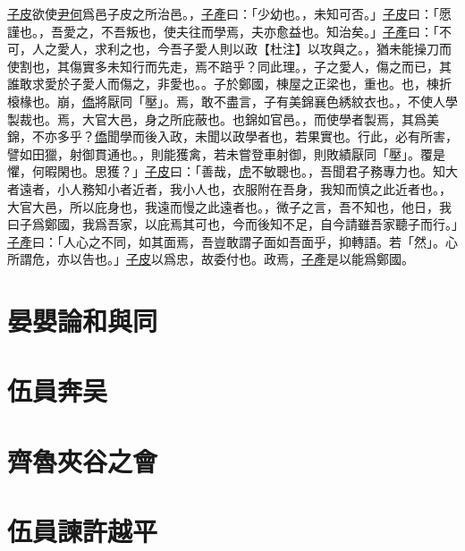 \documentclass{article}
\newcommand{\tsu}{\small\kaishu\color{brown}}
\newcommand{\ta}{\small\kaishu\color{applegreen}}
\begin{document}
\uline{子皮}欲使\uline{尹何}爲邑{\tsu 子皮之所治邑。}，\uline{子產}曰：「少{\tsu 幼也。}，未知可否。」\uline{子皮}曰：「愿{\tsu 謹也。}，吾愛之，不吾叛也，使夫往而學焉，夫亦愈{\tsu 益也。}知治矣。」\uline{子產}曰：「不可，人之愛人，求利之也，今吾子愛人則以政{\ta 【杜注】以攻與之。}，猶未能操刀而使割也，其傷實多{\tsu 未知行而先走，焉不踣乎？同此理。}，子之愛人，傷之而已，其誰敢求愛於子{\tsu 愛人而傷之，非愛也。}。子於鄭國，棟{\tsu 屋之正梁也，重也。}也，棟折榱{\tsu 椽也。}崩，\uline{僑}將厭{\tsu 同「壓」。}焉，敢不盡言，子有美錦{\tsu 襄色綉紋衣也。}，不使人學製{\tsu 裁也。}焉，大官大邑，身之所庇{\tsu 蔽也。}也{\tsu 錦如官邑。}，而使學者製焉，其爲美錦，不亦多乎？\uline{僑}聞學而後入政，未聞以政學者也，若果{\tsu 實也。}行此，必有所害，譬如田獵，射御貫{\tsu 通也。}，則能獲禽，若未嘗登車射御，則敗績厭{\tsu 同「壓」。}覆是懼，何暇{\tsu 閑也。}思獲？」\uline{子皮}曰：「善哉，\uline{虎}不敏{\tsu 聰也。}，吾聞君子務{\tsu 專力也。}知大者遠者，小人務知小者近者，我小人也，衣服附在吾身，我知而慎之{\tsu 此近者也。}，大官大邑，所以庇身也，我遠而慢之{\tsu 此遠者也。}，微子之言，吾不知也，他日，我曰子爲鄭國，我爲吾家，以庇焉其可也，今而後知不足，自今請雖吾家聽子而行。」\uline{子產}曰：「人心之不同，如其面焉，吾豈敢謂子面如吾面乎，抑{\tsu 轉語。若「然」。}心所謂危，亦以告也。」\uline{子皮}以爲忠，故委{\tsu 付也。}政焉，\uline{子產}是以能爲鄭國。
\section{晏嬰論和與同}

\section{伍員奔吴}

\section{齊魯夾谷之會}

\section{伍員諫許越平}
\end{document}
